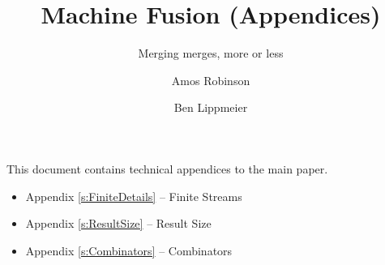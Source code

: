 \documentclass[sigconf,review]{acmart}
\begin{document}
\title{Machine Fusion (Appendices)}
\subtitle{Merging merges, more or less}

\author{Amos Robinson}

\author{Ben Lippmeier}

\makeatactive
\maketitle

\appendix

\vspace{5em}
This document contains technical appendices to the main paper.

\begin{itemize}
\item Appendix \ref{s:FiniteDetails} -- Finite Streams
\item Appendix \ref{s:ResultSize}    -- Result Size
\item Appendix \ref{s:Combinators}   -- Combinators
\end{itemize}



\clearpage{}


% 
\end{document}
